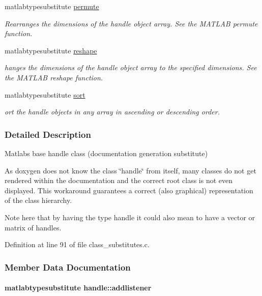 \begin{DoxyCompactItemize}
matlabtypesubstitute \hyperlink{classhandle_a6dc9f59313af54f392d8e273d71ace7b}{permute}
\begin{DoxyCompactList}\small\item\em Rearranges the dimensions of the handle object array. See the M\+A\+T\+L\+AB permute function. \end{DoxyCompactList}\item 
matlabtypesubstitute \hyperlink{classhandle_acef58ae5e52255411835a4fcaf2edd49}{reshape}
\begin{DoxyCompactList}\small\item\em hanges the dimensions of the handle object array to the specified dimensions. See the M\+A\+T\+L\+AB reshape function. \end{DoxyCompactList}\item 
matlabtypesubstitute \hyperlink{classhandle_ad11b0be4c173a9d31122c1298eb96a97}{sort}
\begin{DoxyCompactList}\small\item\em ort the handle objects in any array in ascending or descending order. \end{DoxyCompactList}\end{DoxyCompactItemize}


\subsubsection{Detailed Description}
Matlab\textquotesingle{}s base handle class (documentation generation substitute) 

As doxygen does not know the class \char`\"{}handle\char`\"{} from itself, many classes do not get rendered within the documentation and the correct root class is not even displayed. This workaround guarantees a correct (also graphical) representation of the class hierarchy.

Note here that by having the type handle it could also mean to have a vector or matrix of handles. 

Definition at line 91 of file class\+\_\+substitutes.\+c.



\subsubsection{Member Data Documentation}
\paragraph[{\texorpdfstring{addlistener}{addlistener}}]{\setlength{\rightskip}{0pt plus 5cm}matlabtypesubstitute handle\+::addlistener}\hypertarget{classhandle_aa72d46799b8792edbf8acb7349680c15}{}\label{classhandle_aa72d46799b8792edbf8acb7349680c15}


